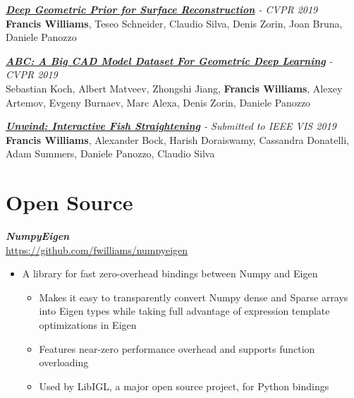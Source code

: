 \documentclass[line,10pt]{res}
\newcommand{\resumetitlemar}{0.5em}
\begin{document}
\begin{resume}
{\sl \textbf{\href{https://arxiv.org/abs/1811.10943}{Deep Geometric Prior for Surface Reconstruction}} - CVPR 2019}\\ 
\textbf{Francis Williams}, Teseo Schneider, Claudio Silva, Denis Zorin, Joan Bruna, Daniele Panozzo

{\sl \textbf{\href{https://arxiv.org/abs/1812.06216}{ABC: A Big CAD Model Dataset For Geometric Deep Learning}} - CVPR 2019}\\ 
Sebastian Koch, Albert Matveev, Zhongshi Jiang, \textbf{Francis Williams}, Alexey Artemov, Evgeny Burnaev, Marc Alexa, Denis Zorin, Daniele Panozzo

{\sl \textbf{\href{https://arxiv.org/abs/1904.04890}{Unwind: Interactive Fish Straightening}} - Submitted to IEEE VIS 2019}\\
\textbf{Francis Williams}, Alexander Bock, Harish Doraiswamy, Cassandra Donatelli, Adam Summers, Daniele Panozzo, Claudio Silva




\vspace{0.2em}
\section{\Large \sc \textbf Open Source}
\vspace{0.5em}

{\sl \textbf{NumpyEigen}}\\
\url{https://github.com/fwilliams/numpyeigen}
\vspace{\resumetitlemar}
\begin{itemize} \itemsep -2pt
\item A library for fast zero-overhead bindings between Numpy and Eigen
\vspace{-0.4em}
\begin{itemize} \itemsep -2pt
\item Makes it easy to transparently convert Numpy dense and Sparse arrays into Eigen types while taking full advantage of expression template optimizations in Eigen
\item Features near-zero performance overhead and supports function overloading
\item Used by LibIGL, a major open source project, for Python bindings 
\end{itemize}
\end{itemize}


\end{resume}
\end{document}
